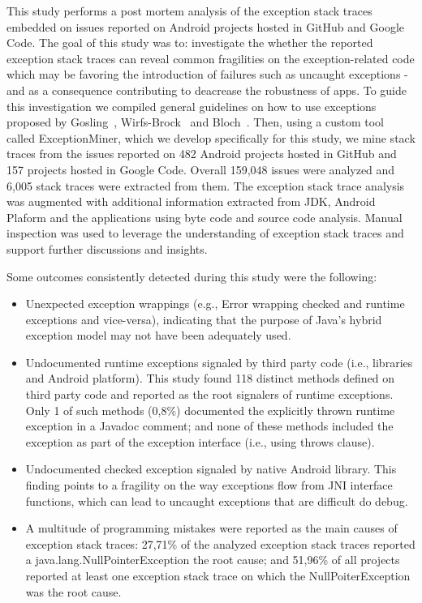 \documentclass[conference]{IEEEtran}
\begin{document}
This study performs a post mortem analysis of the exception stack traces embedded on issues
reported on Android projects hosted in GitHub and Google Code. 
The goal of this study was to: investigate the whether the reported exception stack traces
 can reveal common fragilities on the exception-related code which may be favoring 
the introduction of failures such as uncaught exceptions - and as a consequence
 contributing to deacrease the robustness of apps.
To guide this investigation we compiled general guidelines on how to use
exceptions proposed by Gosling~\cite{gosling2000java},
Wirfs-Brock~\cite{wirfs2006toward} and Bloch~\cite{bloch2008effective}.
Then, using a custom tool called ExceptionMiner,
 which we develop specifically for this study, we mine stack traces from the issues reported 
on 482 Android projects hosted in GitHub and 157 projects hosted in Google Code.
Overall 159,048 issues were analyzed and 6,005 stack traces were extracted from them.
The exception stack trace analysis was augmented with additional information
extracted from JDK, Android Plaform and the applications using byte code 
and source code analysis. Manual inspection was used to leverage the understanding 
of exception stack traces and support further discussions and insights.

Some outcomes consistently detected during this study were the following:

\begin{itemize}

   \item  Unexpected exception wrappings (e.g., Error wrapping checked and runtime
    exceptions and vice-versa), indicating that the purpose of Java's hybrid exception model may not have been adequately used.

   \item Undocumented runtime exceptions signaled by third party code (i.e., libraries and Android platform). 
This study found 118 distinct methods defined on third party code and  reported as the root signalers of 
runtime exceptions. Only 1 of such methods (0,8\%) documented the explicitly thrown runtime exception 
in a Javadoc comment; and none of these methods included the exception as part of the exception 
interface (i.e., using throws clause).

   \item Undocumented checked exception signaled by native Android library. This finding points to a fragility 
on the way exceptions flow from JNI interface functions, which can lead to uncaught exceptions that are difficult do 
debug. 

  \item  A multitude of programming mistakes were reported as the main causes of exception stack traces:
 27,71\% of the analyzed exception stack traces reported a java.lang.NullPointerException the root cause;
and  51,96\% of all projects reported at least one exception stack trace on which the NullPoiterException
was the root cause.

\end{itemize}
\end{document}
